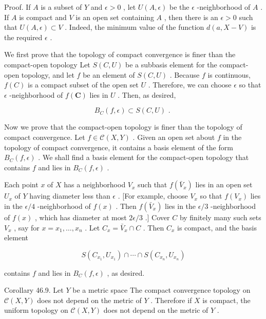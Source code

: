 Proof. If \(A\) is a subset of \(Y\) and \(\epsilon  > 0\) , let \(U\left( {A,\epsilon }\right)\) be the \(\epsilon\) -neighborhood of \(A\) . If \(A\) is compact and \(V\) is an open set containing \(A\) , then there is an \(\epsilon  > 0\) such that \(U\left( {A,\epsilon }\right)  \subset  V\) . Indeed, the minimum value of the function \(d\left( {a,X - V}\right)\) is the required \(\epsilon\) .

We first prove that the topology of compact convergence is finer than the compact-open topology Let \(S\left( {C,U}\right)\) be a subbasis element for the compact-open topology, and let \(f\) be an element of \(S\left( {C,U}\right)\) . Because \(f\) is continuous, \(f\left( C\right)\) is a compact subset of the open set \(U\) . Therefore, we can choose \(\epsilon\) so that \(\epsilon\) -neighborhood of \(f\left( \mathbf{C}\right)\) lies in \(U\) . Then, as desired,

\[
{B}_{C}\left( {f,\epsilon }\right)  \subset  S\left( {C,U}\right) \text{ . }
\]

Now we prove that the compact-open topology is finer than the topology of compact convergence. Let \(f \in  \mathcal{C}\left( {X,Y}\right)\) . Given an open set about \(f\) in the topology of compact convergence, it contains a basis element of the form \({B}_{C}\left( {f,\epsilon }\right)\) . We shall find a basis element for the compact-open topology that contains \(f\) and lies in \({B}_{C}\left( {f,\epsilon }\right)\) .

Each point \(x\) of \(X\) has a neighborhood \({V}_{x}\) such that \(f\left( {\bar{V}}_{x}\right)\) lies in an open set \({U}_{x}\) of \(Y\) having diameter less than \(\epsilon\) . [For example, choose \({V}_{x}\) so that \(f\left( {V}_{x}\right)\) lies in the \(\epsilon /4\) -neighborhood of \(f\left( x\right)\) . Then \(f\left( {\bar{V}}_{x}\right)\) lies in the \(\epsilon /3\) -neighborhood of \(f\left( x\right)\) , which has diameter at most \({2\epsilon }/3\) .] Cover \(C\) by finitely many such sets \({V}_{x}\) , say for \(x = {x}_{1},\ldots ,{x}_{n}\) . Let \({C}_{x} = {\bar{V}}_{x} \cap  C\) . Then \({C}_{x}\) is compact, and the basis element

\[
S\left( {{C}_{{x}_{1}},{U}_{{x}_{1}}}\right)  \cap  \cdots  \cap  S\left( {{C}_{{x}_{n}},{U}_{{x}_{n}}}\right)
\]

contains \(f\) and lies in \({B}_{C}\left( {f,\epsilon }\right)\) , as desired.

Corollary 46.9. Let \(Y\) be a metric space The compact convergence topology on \(\mathcal{C}\left( {X,Y}\right)\) does not depend on the metric of \(Y\) . Therefore if \(X\) is compact, the uniform topology on \(\mathcal{C}\left( {X,Y}\right)\) does not depend on the metric of \(Y\) .

